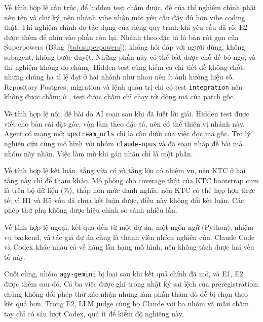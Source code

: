 Về tính hợp lệ cấu trúc, để hidden test chấm được, đề của thí nghiệm chính phải nêu tên và chữ ký, nên nhánh
vibe nhận một yêu cầu đầy đủ hơn vibe coding thật. Thí nghiệm chính đo tác dụng của riêng quy trình khi yêu cầu
đã rõ; E2 được thêm để nhìn vào phần còn lại. Nhánh theo đặc tả là bản rút gọn của Superpowers
(Bảng~\ref{tab:superpowers}): không hỏi đáp với người dùng, không subagent, không bước duyệt. Những phần
này có thể bắt được chỗ đề bỏ ngỏ, và thí nghiệm không đo chúng. Hidden test cũng kiểm cả chi tiết đề không
chốt, nhưng chúng hạ tỉ lệ đạt ở hai nhánh như nhau nên ít ảnh hưởng hiệu số. Repository Postgres, migration và lệnh quản trị chỉ có test \texttt{integration} nên không được
chấm; ở \NumGradedMediumMinTasks{}, test được chấm chỉ chạy tới \NumGradedMediumMin{} dòng mã của patch gốc.

Về tính hợp lệ nội, đề bài do AI soạn sau khi đã biết lời giải. Hidden test được viết cho bản cài đặt gốc,
vốn làm theo đặc tả, nên có thể thiên vị nhánh này. Agent có mạng mở; \texttt{upstream\_urls} chỉ là cận dưới
của việc đọc mã gốc. Trợ lý nghiên cứu cùng mô hình với nhóm \texttt{claude-opus} và đã soạn nháp đề bài mà nhóm
này nhận. Việc làm mù khi gán nhãn chỉ là một phần.

Về tính hợp lệ kết luận, tầng vừa có \NumMediumTasks{} và tầng lớn có \NumFeatureTasks{} nhiệm vụ, nên
KTC ở hai tầng này chỉ để tham khảo. Mô phỏng cho coverage thật của KTC bootstrap cụm là \NumResCoverageHits{} trên
\NumResCoverageSets{} bộ dữ liệu (\NumResCoveragePct{}\%), thấp hơn mức danh nghĩa, nên KTC có thể hẹp hơn thực
tế; vì H1 và H5 vốn đã chưa kết luận được, điều này không đổi kết luận. Các phép thử phụ không được hiệu chỉnh so
sánh nhiều lần.

Về tính hợp lệ ngoại, kết quả đến từ một dự án, một ngôn ngữ (Python), \NumTasksMain{} nhiệm vụ backend, và
tác giả dự án cũng là thành viên nhóm nghiên cứu. Claude Code và Codex khác nhau cả về hãng lẫn hạng mô hình, nên không tách được hai yếu tố này.

Cuối cùng, nhóm \texttt{agy-gemini} bị loại sau khi kết quả chính đã mở, và E1, E2
được thêm sau đó. Cả ba việc được ghi trong nhật ký sai lệch của preregistration; chúng không đổi
phép thử xác nhận nhưng làm phần thăm dò dễ bị chọn theo kết quả hơn. Trong E2, LLM judge cùng họ Claude
với ba nhóm và mẫu chấm tay chỉ có sáu lượt Codex, quá ít để kiểm độ nghiêng này.
